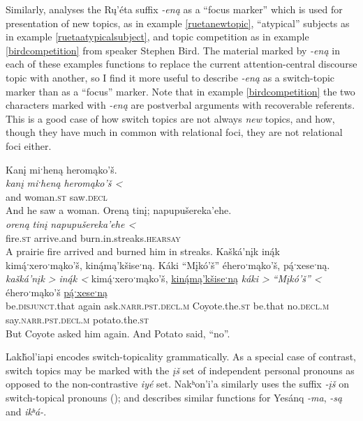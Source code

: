 \documentclass[output=paper]{LSP/langsci}
\begin{document}
	Similarly, \citet{Wolvengrey1990} analyses the Rų’éta suffix \emph{-eną} as a “focus marker” which is used for presentation of new topics, as in example \ref{ruetanewtopic}, “atypical” subjects as in example \ref{ruetaatypicalsubject}, and topic competition as in example \ref{birdcompetition} from speaker Stephen Bird. The material marked by \emph{-eną} in each of these examples functions to replace the current attention-central discourse topic with another, so I find it more useful to describe \emph{-eną} as a switch-topic marker than as a “focus” marker. Note that in example \ref{birdcompetition} the two characters marked with \emph{-eną} are postverbal arguments with recoverable referents. This is a good case of how switch topics are not always \emph{new} topics, and how, though they have much in common with relational foci, they are not relational foci either.

\ea\label{ruetaswitchtopic}
\ea\label{ruetanewtopic}
Kanį miˑheną heromąko’š.\footnotemark\\
\gll 	\emph{kanį}	 	\emph{miˑheną} 	\emph{heromąko’š <}\\
	and 			woman.\textsc{st} 	saw.\textsc{decl}\\
\glt	And he saw a woman.
\ex\label{ruetaatypicalsubject}
Oreną tinį; napupušereka’ehe.\footnotemark\\
\gll 	\emph{oreną}	\emph{tinį}	\emph{napupušereka’ehe <}\\
	fire.\textsc{st} 	arrive.and 	burn.in.streaks.\textsc{hearsay}\\
\glt	A prairie fire arrived and burned him in streaks.
\ex\label{birdcompetition}
Kašká’nįk in\'{ą}k kim\'{ą}ˑxeroˑmąko’š, kin\'{ą}mą’kšiseˑną. Káki “Mįkó’š” éheroˑmąko’š, p\'{ą}ˑxeseˑną.\footnotemark\\
\gll 	\emph{kašká’nįk >}		\emph{in\'{ą}k <} 	kim\'{ą}ˑxeroˑmąko’š, 		\underline{kin\'{ą}mą’kšiseˑną}	\emph{káki >}	\emph{“Mįkó’š” <}			éheroˑmąko’š 			\underline{p\'{ą}ˑxeseˑną}\\
	be.\textsc{disjunct}.that 	again 			ask.\textsc{narr.pst.decl.m} 	Coyote.the.\textsc{st}		be.that 		no.\textsc{decl.m} 					say.\textsc{narr.pst.decl.m} 	potato.the.\textsc{st}\\
\glt	But Coyote asked him again. And Potato said, “no”.
\z\z

	Lakȟol’iapi encodes switch-topicality grammatically. As a special case of contrast, switch topics may be marked with the \emph{įš} set of independent personal pronouns as opposed to the non-contrastive \emph{iyé} set. Nakʰon’i’a similarly uses the suffix \emph{-įš} on switch-topical pronouns (\citealt[129--30]{Cumberland2005}); and \citealt[149]{Oliverio1996} describes similar functions for Yesánq \emph{-ma}, \emph{-są} and \emph{ikʰá-}. 
	
\end{document}
